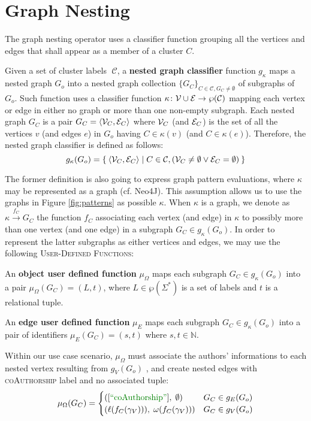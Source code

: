 \section{Graph Nesting}\label{sec:nestingdef}
The graph nesting operator uses a classifier function grouping all the vertices and edges that shall appear as a member of a cluster $C$. 

\begin{definition}
	Given a set of cluster labels $\;\mathcal{C}$, a \textbf{nested graph classifier} function $g_\kappa$ maps a nested graph $G_o$ into a nested  graph collection $\{G_C\}_{C\in\mathcal{C},G_C\neq \emptyset}$ of subgraphs of $G_o$. Such function uses a classifier function $\kappa\colon \mathcal{V}\cup \mathcal{E}\to \wp(\mathcal{C})$ mapping each vertex or edge in either no graph or more than one non-empty subgraph. Each nested graph $G_C$ is a pair
	$G_C=\Braket{\mathcal{V}_C,\mathcal{E}_C}$
	where $\mathcal{V}_C$ (and $\mathcal{E}_C$) is the set of all the vertices $v$ (and edges $e$) in $G_o$ having $C\in \kappa(v)$ (and $C\in \kappa(e)$). Therefore, the nested graph classifier is defined as follows:
	\[g_\kappa(G_o)=\Set{\Braket{\mathcal{V}_C,\mathcal{E}_C}|C\in\mathcal{C},(\mathcal{V}_C\neq\emptyset\vee\mathcal{E}_C=\emptyset)}\]
\end{definition}

The former definition is also going to express graph pattern evaluations, where $\kappa$ may be represented as a graph (cf. Neo4J). This assumption allows us to use the graphs in Figure \ref{fig:patterns} as possible $\kappa$. When $\kappa$ is a graph, we denote as $\kappa\xrightarrow{f_C} G_C$ the function $f_C$ associating  each vertex (and edge) in $\kappa$ to possibly more than one vertex (and one edge) in a subgraph $G_C\in g_\kappa(G_o)$. In order to represent the latter subgraphs  as either vertices and edges, we may use
the following \textsc{User-Defined Functions}:
\begin{definition}
	An \textbf{object user defined function} $\mu_\Omega$ maps each subgraph $G_C\in g_\kappa(G_o)$ into a pair $\mu_\Omega(G_C)=(L,t)$, where $L\in\wp(\Sigma^*)$ is a set of labels and $t$ is a relational tuple.
	
	An \textbf{edge user defined function} $\mu_E$ maps each subgraph $G_C\in g_\kappa(G_o)$ into a pair of identifiers $\mu_E(G_C)=(s,t)$ where $s,t\in\mathbb{N}$.
\end{definition}

\begin{ex}
Within our use case scenario, $\mu_\Omega$  must associate  the authors' informations to each nested vertex resulting from $g_{V}(G_{o})$ , and create nested edges with \textsc{coAuthorship} label and no associated tuple:
\[\mu_\Omega(G_C)=\begin{cases}
([\mstr{coAuthorship}],\;\emptyset) & G_C \in g_E(G_{o})\\
(\ell(f_C(\gamma_V))),\;\omega(f_C(\gamma_V))) & G_C \in g_V(G_{o})\\
\end{cases}\]
\end{ex}

